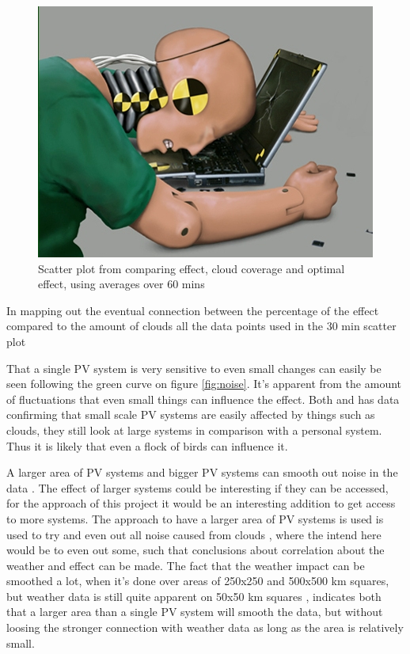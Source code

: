 \begin{figure}
  \centering
  \includegraphics{dummy.jpg}
  \caption{Scatter plot from comparing effect, cloud coverage and
    optimal effect, using averages over 60 mins}
  \label{fig:scatter60}
\end{figure}

In mapping out the eventual connection between the percentage of the
effect compared to the amount of clouds all the data points used in
the 30 min scatter plot

That a single PV system is very sensitive to even small changes can
easily be seen following the green curve on figure \ref{fig:noise}.
It's apparent from the amount of fluctuations that even small things
can influence the effect.  Both \citep{cloudTrack} and
\citep{southafrica} has data confirming that small scale PV systems
are easily affected by things such as clouds, they still look at large
systems in comparison with a personal system.  Thus it is likely that
even a flock of birds can influence it.

A larger area of PV systems and bigger PV systems can smooth out noise
in the data \citep{southafrica,cloudTrack}.  The effect of larger
systems could be interesting if they can be accessed, for the approach
of this project it would be an interesting addition to get access to
more systems.  The approach to have a larger area of PV systems is
used is used to try and even out all noise caused from clouds
\citep{southafrica}, where the intend here would be to even out some,
such that conclusions about correlation about the weather and effect
can be made.  The fact that the weather impact can be smoothed a lot,
when it's done over areas of 250x250 and 500x500 km squares, but
weather data is still quite apparent on 50x50 km squares
\citep{southafrica}, indicates both that a larger area than a single
PV system will smooth the data, but without loosing the stronger
connection with weather data as long as the area is relatively small.

